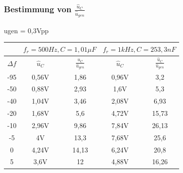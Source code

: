\documentclass{article}
\begin{document}
  \subsubsection{Bestimmung von $\frac{\hat{u}_C}{\hat{u}_{gen}}$}
ugen = 0,3Vpp
\begin{table}[h]
  \begin{center}

    \begin{tabular}{|c|c|c|c|c|}
      \hline
                 & \multicolumn{2}{c|}{$f_r = 500Hz, C = 1,01\mu F$} & \multicolumn{2}{c|}{$f_r = 1kHz, C= 253,3 nF$}                                                   \\
      \hline
      $\Delta f$ & $\hat{u}_C$                                       & $\frac{\hat{u}_C}{\hat{u}_{gen}}$              & $\hat{u}_C$ & $\frac{\hat{u}_C}{\hat{u}_{gen}}$ \\
      \hline
      -95        & 0,56V                                             & 1,86                                           & 0,96V       & 3,2                               \\
      \hline
      -50        & 0,88V                                             & 2,93                                           & 1,6V        & 5,3                               \\
      \hline
      -40        & 1,04V                                             & 3,46                                           & 2,08V       & 6,93                              \\
      \hline
      -20        & 1,68V                                             & 5,6                                            & 4,72V       & 15,73                             \\
      \hline
      -10        & 2,96V                                             & 9,86                                           & 7,84V       & 26,13                             \\
      \hline
      -5         & 4V                                                & 13,3                                           & 7,68V       & 25,6                              \\
      \hline
      0          & 4,24V                                             & 14,13                                          & 6,24V       & 20,8                              \\
      \hline
      5          & 3,6V                                              & 12                                             & 4,88V       & 16,26                             \\

\end{tabular}
\end{center}
\end{table}
\end{document}
